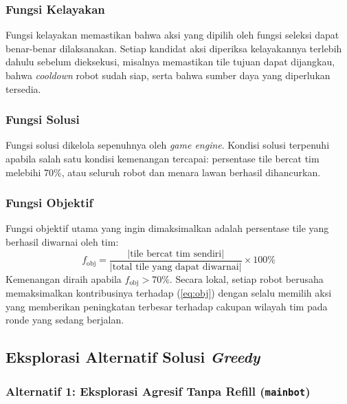 \subsubsection{Fungsi Kelayakan}

Fungsi kelayakan memastikan bahwa aksi yang dipilih oleh fungsi seleksi
dapat benar-benar dilaksanakan.  Setiap kandidat aksi diperiksa
kelayakannya terlebih dahulu sebelum dieksekusi, misalnya memastikan tile
tujuan dapat dijangkau, bahwa \textit{cooldown} robot sudah siap, serta
bahwa sumber daya yang diperlukan tersedia.

\subsubsection{Fungsi Solusi}

Fungsi solusi dikelola sepenuhnya oleh \textit{game engine}.  Kondisi
solusi terpenuhi apabila salah satu kondisi kemenangan tercapai:
persentase tile bercat tim melebihi 70\%, atau seluruh robot dan menara
lawan berhasil dihancurkan.

\subsubsection{Fungsi Objektif}

Fungsi objektif utama yang ingin dimaksimalkan adalah persentase tile
yang berhasil diwarnai oleh tim:
\begin{equation}
    f_{\text{obj}} =
    \frac{|\text{tile bercat tim sendiri}|}
         {|\text{total tile yang dapat diwarnai}|}
    \times 100\%
    \label{eq:obj}
\end{equation}
Kemenangan diraih apabila $f_{\text{obj}} > 70\%$.  Secara lokal, setiap
robot berusaha memaksimalkan kontribusinya terhadap (\ref{eq:obj}) dengan
selalu memilih aksi yang memberikan peningkatan terbesar terhadap cakupan
wilayah tim pada ronde yang sedang berjalan.

\subsection{Eksplorasi Alternatif Solusi \textit{Greedy}}

\subsubsection{Alternatif 1: Eksplorasi Agresif Tanpa Refill (\texttt{mainbot})}

